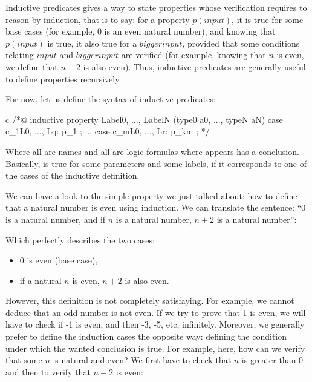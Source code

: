 Inductive predicates gives a way to state properties whose verification requires
to reason by induction, that is to say: for a property $p(input)$, it is true
for some base cases (for example, $0$ is an even natural number), and knowing
that $p(input)$ is true, it also true for a $bigger input$, provided that some
conditions relating $input$ and $bigger input$ are verified (for example, knowing
that $n$ is even, we define that $n+2$ is also even). Thus, inductive predicates
are generally useful to define properties recursively.


For now, let us define the syntax of inductive predicates:

\begin{CodeBlock}{c}
/*@
  inductive property{ Label0, ..., LabelN }(type0 a0, ..., typeN aN) {
  case c_1{L0, ..., Lq}: p_1 ;
  ...
  case c_m{L0, ..., Lr}: p_km ;
  }
*/
\end{CodeBlock}

Where all  are names and all  are logic
formulas where  appears has a conclusion. Basically,
 is true for some parameters and some labels, if it
corresponds to one of the cases of the inductive definition.

We can have a look to the simple property we just talked about: how to define
that a natural number is even using induction. We can translate the sentence:
``0 is a natural number, and if $n$ is a natural number, $n+2$ is a natural
number'':






Which perfectly describes the two cases:
\begin{itemize}
\item $0$ is even (base case),
\item if a natural $n$ is even, $n+2$ is also even.
\end{itemize}
  
However, this definition is not completely satisfaying. For example, we cannot
deduce that an odd number is not even. If we try to prove that 1 is even, we
will have to check if -1 is even, and then -3, -5, etc, infinitely. Moreover,
we generally prefer to define the induction cases the opposite way: defining
the condition under which the wanted conclusion is true. For example, here,
how can we verify that some $n$ is natural and even? We first have to check that
$n$ is greater than $0$ and then to verify that $n-2$ is even:



